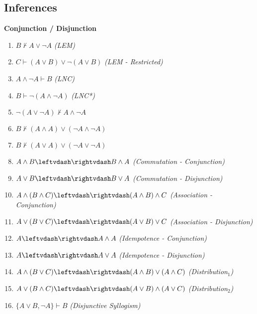 \begin{singlespace}
\section{Inferences}\label{inferencesM}

\setcounter{enumi_saved}{1}

\noindent \textbf{Conjunction / Disjunction}

\begin{enumerate}
\setcounter{enumi}{\value{enumi_saved}}
\item $ B\nvdash  A \vee  \neg A $\hfill\emph{ (LEM)}  
\item $ C\vdash  (A \vee  B) \vee  \neg (A \vee  B) $\hfill\emph{ (LEM - Restricted)}  
\item $ A \wedge  \neg A\vdash  B $\hfill\emph{ (LNC)}  
\item $ B\vdash  \neg (A \wedge  \neg A) $\hfill\emph{ (LNC*)}  
\item $ \neg (A \vee  \neg A)\nvdash  A \wedge  \neg A $\hfill\emph{ }  
\item $ B\nvdash  (A \wedge  A) \vee  (\neg A \wedge  \neg A) $\hfill\emph{ }  
\item $ B\nvdash  (A \vee  A) \vee  (\neg A \vee  \neg A) $\hfill\emph{ }  
\item $ A \wedge  B\leftvdash\rightvdash  B \wedge  A $ \hfill\emph{ (Commutation - Conjunction)}  
\item $ A \vee  B\leftvdash\rightvdash  B \vee  A $ \hfill\emph{ (Commutation - Disjunction)}  
\item $ A \wedge  (B \wedge  C)\leftvdash\rightvdash  (A \wedge  B) \wedge  C $ \hfill\emph{ (Association - Conjunction)}  
\item $ A \vee  (B \vee  C)\leftvdash\rightvdash  (A \vee  B) \vee  C $ \hfill\emph{ (Association - Disjunction)}  
\item $ A\leftvdash\rightvdash  A \wedge  A $ \hfill\emph{ (Idempotence - Conjunction)}  
\item $ A\leftvdash\rightvdash  A \vee  A $ \hfill\emph{ (Idempotence - Disjunction)}  
\item $ A \wedge  (B \vee  C)\leftvdash\rightvdash  (A \wedge  B) \vee  (A \wedge  C) $ \hfill\emph{ (Distribution$_1$)}  
\item $ A \vee  (B \wedge  C)\leftvdash\rightvdash  (A \vee  B) \wedge  (A \vee  C) $ \hfill\emph{ (Distribution$_2$)}  
\item $ \{A \vee  B, \neg A \} \vdash  B $\hfill\emph{ (Disjunctive Syllogism)}  
\setcounter{enumi_saved}{\value{enumi}}
\end{enumerate}


\end{singlespace}
